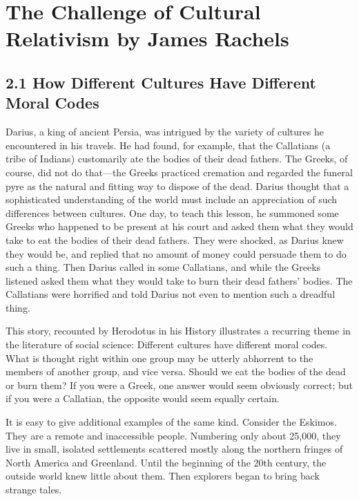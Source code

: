 \chapter{The Challenge of Cultural Relativism by James Rachels}\autocite{Rachels1}
\label{challengerelativism}
\setcounter{fz}{\thefootnote}
\setcounter{footnote}{0}


\section{2.1 How Different Cultures Have Different Moral Codes} 
Darius, a king of ancient Persia, was intrigued by the variety of cultures 
he  encountered  in  his  travels.  He  had  found,  for  example,  that  the 
Callatians  (a  tribe  of  Indians)  customarily  ate  the  bodies  of  their  dead 
fathers.  The  Greeks,  of  course,  did  not  do  that—the Greeks  practiced 
cremation and regarded the funeral pyre as the natural and fitting way to 
dispose  of  the  dead.  Darius  thought  that  a  sophisticated  understanding 
of  the  world  must  include  an  appreciation  of  such  differences  between 
cultures. One day, to teach this lesson, he summoned some Greeks who 
happened  to  be  present  at  his  court  and  asked  them  what  they  would 
take  to  eat  the  bodies  of  their  dead  fathers.  They  were  shocked,  as 
Darius knew they would be, and replied that no amount of money could 
persuade them to do such a thing. Then Darius called in some 
Callatians,  and  while  the  Greeks  listened  asked  them  what  they  would 
take to burn their dead fathers' bodies. The Callatians were horrified and 
told Darius not even to mention such a dreadful thing.

This  story,  recounted  by  Herodotus  in  his  History  illustrates  a  recurring 
theme in the literature of social science: Different cultures have different 
moral  codes.  What  is  thought  right  within  one  group  may  be  utterly 
abhorrent  to the members  of another  group, and  vice versa. Should  we 
eat  the  bodies  of  the  dead  or  burn  them?  If  you  were  a  Greek,  one 
answer  would  seem  obviously  correct;  but  if  you  were  a  Callatian,  the 
opposite would seem equally certain. 

It  is  easy  to  give  additional  examples  of  the  same  kind.  Consider  the 
Eskimos.  They  are  a  remote  and  inaccessible  people.  Numbering  only 
about  25,000,  they  live  in  small,  isolated  settlements  scattered  mostly 
along  the  northern  fringes  of  North  America  and  Greenland.  Until  the 
beginning  of  the  20th  century,  the  outside  world knew  little  about  them. 
Then explorers began to bring back strange tales. 

